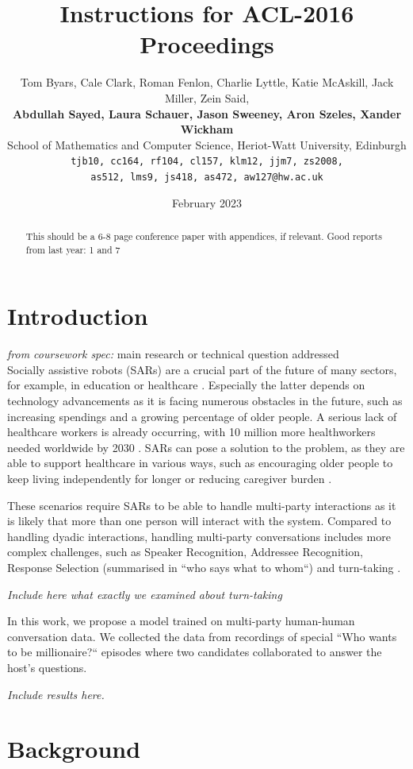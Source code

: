 \documentclass[hidelinks, 11pt]{article}
\title{Instructions for ACL-2016 Proceedings}
\author{Tom Byars, Cale Clark, Roman Fenlon, Charlie Lyttle, Katie McAskill, Jack Miller, Zein Said, \\
{\bf Abdullah Sayed, Laura Schauer, Jason Sweeney, Aron Szeles, Xander Wickham} \\
School of Mathematics and Computer Science, Heriot-Watt University, Edinburgh \\ {\tt {tjb10, cc164, rf104, cl157, klm12, jjm7, zs2008,}} \\ {\tt {as512, lms9, js418, as472, aw127}@hw.ac.uk}}
\date{February 2023}
\begin{document}
\maketitle
\begin{abstract}
  This should be a 6-8 page conference paper with appendices, if relevant.
  Good reports from last year: 1 and 7
\end{abstract}


\section{Introduction}
\label{sec:introduction}

\textit{from coursework spec:} main research or technical question addressed \\
Socially assistive robots (SARs) are a crucial part of the future of many sectors, for example, in education or healthcare \cite{gunson_visually_aware_2022}. Especially the latter depends on technology advancements as it is facing numerous obstacles in the future, such as increasing spendings and a growing percentage of older people. A serious lack of healthcare workers is already occurring, with 10 million more healthworkers needed worldwide by 2030 \cite{cooper_ari_2020,Health_workforce_2023}. SARs can pose a solution to the problem, as they are able to support healthcare in various ways, such as encouraging older people to keep living independently for longer or reducing caregiver burden \cite{cooper_ari_2020}.

These scenarios require SARs to be able to handle multi-party interactions as it is likely that more than one person will interact with the system. Compared to handling dyadic interactions, handling multi-party conversations includes more complex challenges, such as Speaker Recognition, Addressee Recognition, Response Selection (summarised in “who says what to whom“) and turn-taking \cite{Group_1_unpublished_paper,Johansson_Skantze_2015}.

\textit{Include here what exactly we examined about turn-taking}

In this work, we propose a model trained on multi-party human-human conversation data. We collected the data from recordings of special “Who wants to be millionaire?“ episodes where two candidates collaborated to answer the host's questions.

\textit{Include results here.}


\section{Background}
\label{sec:background}
\end{document}
